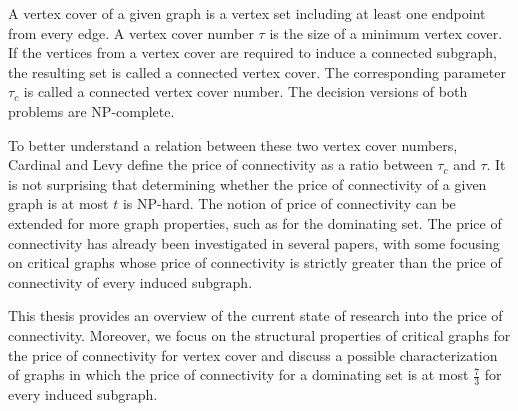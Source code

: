 \documentclass[12pt]{report}
\begin{document}
A vertex cover of a given graph is a vertex set including at least one
endpoint from every edge.  A vertex cover number \(\tau\) is the size
of a minimum vertex cover. If the vertices from a vertex cover are
required to induce a connected subgraph, the resulting set is called a
connected vertex cover.  The corresponding parameter \(\tau_c\) is
called a connected vertex cover number. The decision versions of both
problems are NP-complete.

To better understand a relation between these two vertex cover
numbers, Cardinal and Levy define the price of connectivity as a ratio
between \(\tau_c\) and \(\tau\). It is not surprising that determining
whether the price of connectivity of a given graph is at most \(t\) is
NP-hard. The notion of price of connectivity can be extended for more
graph properties, such as for the dominating set. The price of
connectivity has already been investigated in several papers, with
some focusing on critical graphs whose price of connectivity is
strictly greater than the price of connectivity of every induced
subgraph.

This thesis provides an overview of the current state of research into
the price of connectivity. Moreover, we focus on the structural
properties of critical graphs for the price of connectivity for vertex
cover and discuss a possible characterization of graphs in which the
price of connectivity for a dominating set is at most \(\frac{7}{3}\)
for every induced subgraph.
\end{document}
